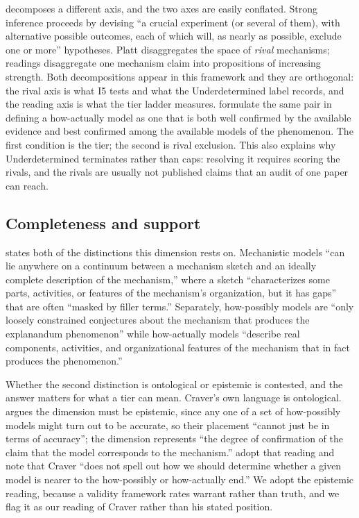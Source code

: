 \documentclass{article}
\begin{document}
\citet{platt1964strong} decomposes a different axis, and the two axes are easily conflated. Strong inference proceeds by devising ``a crucial experiment (or several of them), with alternative possible outcomes, each of which will, as nearly as possible, exclude one or more'' hypotheses. Platt disaggregates the space of \emph{rival} mechanisms; readings disaggregate one mechanism claim into propositions of increasing strength. Both decompositions appear in this framework and they are orthogonal: the rival axis is what I5 tests and what the Underdetermined label records, and the reading axis is what the tier ladder measures. \citet{colombo2015models} formulate the same pair in defining a how-actually model as one that is both well confirmed by the available evidence and best confirmed among the available models of the phenomenon. The first condition is the tier; the second is rival exclusion. This also explains why Underdetermined terminates rather than caps: resolving it requires scoring the rivals, and the rivals are usually not published claims that an audit of one paper can reach.

\subsection{Completeness and support}
\label{sec:related-completeness}

\citet{craver2006when} states both of the distinctions this dimension rests on. Mechanistic models ``can lie anywhere on a continuum between a mechanism sketch and an ideally complete description of the mechanism,'' where a sketch ``characterizes some parts, activities, or features of the mechanism's organization, but it has gaps'' that are often ``masked by filler terms.'' Separately, how-possibly models are ``only loosely constrained conjectures about the mechanism that produces the explanandum phenomenon'' while how-actually models ``describe real components, activities, and organizational features of the mechanism that in fact produces the phenomenon.''

Whether the second distinction is ontological or epistemic is contested, and the answer matters for what a tier can mean. Craver's own language is ontological. \citet{weiskopf2011models} argues the dimension must be epistemic, since any one of a set of how-possibly models might turn out to be accurate, so their placement ``cannot just be in terms of accuracy''; the dimension represents ``the degree of confirmation of the claim that the model corresponds to the mechanism.'' \citet{colombo2015models} adopt that reading and note that Craver ``does not spell out how we should determine whether a given model is nearer to the how-possibly or how-actually end.'' We adopt the epistemic reading, because a validity framework rates warrant rather than truth, and we flag it as our reading of Craver rather than his stated position.
\end{document}
